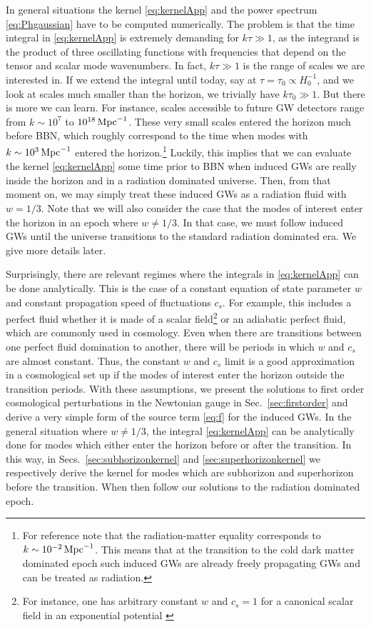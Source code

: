 \documentclass[a4paper,11pt]{article}
\numberwithin{equation}{section}
\begin{document}
In general situations the kernel \eqref{eq:kernelApp} and the power spectrum \eqref{eq:Phgaussian} have to be computed numerically. The problem is that the time integral in \eqref{eq:kernelApp} is extremely demanding for $k\tau\gg 1$, as the integrand is the product of three oscillating functions with frequencies that depend on the tensor and scalar mode wavenumbers. In fact, $k\tau\gg1$ is the range of scales we are interested in. If we extend the integral until today, say at $\tau=\tau_0\propto H_{0}^{-1}$, and we look at scales much smaller than the horizon, we trivially have $k\tau_0\gg1$. But there is more we can learn. For instance, scales accessible to future GW detectors range from $k\sim 10^7$ to $10^{18}\,{\rm Mpc}^{-1}$. These very small scales entered the horizon much before BBN, which roughly correspond to the time when modes with $k\sim 10^{3}\,{\rm Mpc}^{-1}$ entered the horizon.\footnote{For reference note that the radiation-matter equality corresponds to $k\sim 10^{-2}\,{\rm Mpc}^{-1}$. This means that at the transition to the cold dark matter dominated epoch such induced GWs are already freely propagating GWs and can be treated as radiation.} Luckily, this implies that we can evaluate the kernel \eqref{eq:kernelApp} some time prior to BBN when induced GWs are really inside the horizon and in a radiation dominated universe. Then, from that moment on, we may simply treat these induced GWs as a radiation fluid with $w=1/3$. Note that we will also consider the case that the modes of interest enter the horizon in an epoch where $w\neq1/3$. In that case, we must follow induced GWs until the universe transitions to the standard radiation dominated era. We give more details later.

Surprisingly, there are relevant regimes where the integrals in \eqref{eq:kernelApp} can be done analytically. This is the case of a constant equation of state parameter $w$ and constant propagation speed of fluctuations $c_s$. For example, this includes a perfect fluid whether it is made of a scalar field\footnote{For instance, one has arbitrary constant $w$ and $c_s=1$ for a canonical scalar field in an exponential potential \cite{Lucchin:1984yf}} or an adiabatic perfect fluid, which are commonly used in cosmology. Even when there are transitions between one perfect fluid domination to another, there will be periods in which $w$ and $c_s$ are almost constant. Thus, the constant $w$ and $c_s$ limit is a good approximation in a cosmological set up if the modes of interest enter the horizon outside the transition periods. With these assumptions, we present the solutions to first order cosmological perturbations in the Newtonian gauge in Sec.~\ref{sec:firstorder} and derive a very simple form of the source term \eqref{eq:f} for the induced GWs. In the general situation where $w\neq1/3$, the integral \eqref{eq:kernelApp} can be analytically done for modes which either enter the horizon before or after the transition. In this way, in Secs.~\ref{sec:subhorizonkernel} and \ref{sec:superhorizonkernel} we respectively derive the kernel for modes which are subhorizon and superhorizon before the transition. When then follow our solutions to the radiation dominated epoch.\\
\end{document}
